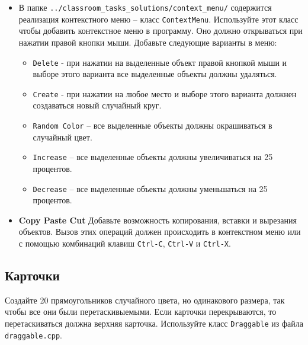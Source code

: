 \documentclass{article}
\begin{document}
\begin{itemize}
\item В папке \texttt{../classroom\_tasks\_solutions/context\_menu/} содержится реализация контекстного меню -- класс \texttt{ContextMenu}. Используйте этот класс чтобы добавить контекстное меню в программу. Оно должно открываться при нажатии правой кнопки мыши. Добавьте следующие варианты в меню:
\begin{itemize}
\item \texttt{Delete} - при нажатии на выделенные объект правой кнопкой мыши и выборе этого варианта все выделенные объекты должны удаляться.
\item \texttt{Create} - при нажатии на любое место и выборе этого варианта должнен создаваться новый случайный круг.
\item \texttt{Random Color} -- все выделенные объекты должны окрашиваться в случайный цвет.
\item \texttt{Increase} -- все выделенные объекты должны увеличиваться на 25 процентов.
\item \texttt{Decrease} -- все выделенные объекты должны уменьшаться на 25 процентов.
\end{itemize}

\item \textbf{Copy Paste Cut} Добавьте возможность копирования, вставки и вырезания объектов. Вызов этих операций должен происходить в контекстном меню или с помощью комбинаций клавиш \texttt{Ctrl-C}, \texttt{Ctrl-V} и \texttt{Ctrl-X}.

\end{itemize}




\subsection{Карточки} 
Создайте 20 прямоугольников случайного цвета, но одинакового размера, так чтобы все они были перетаскивыемыми. Если карточки перекрываются, то перетаскиваться должна верхняя карточка. Используйте класс \texttt{Draggable} из файла \texttt{draggable.cpp}.
	
\end{document}
